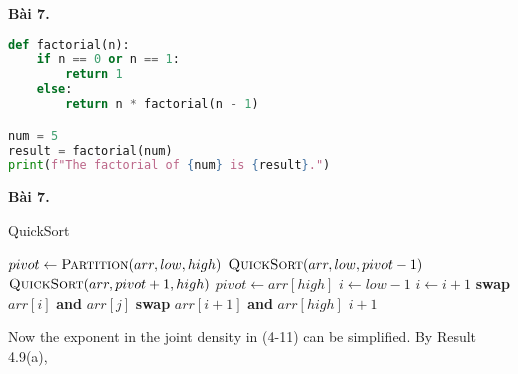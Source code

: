 \documentclass[a4paper,12pt]{article}
\begin{document}

\lstset{style=my_style}

\textbf{Bài 7.}
\begin{lstlisting}[language=Python, caption={Mã nguồn Python}, label={lst:python-code}]
def factorial(n):
    if n == 0 or n == 1:
        return 1
    else:
        return n * factorial(n - 1)

num = 5
result = factorial(num)
print(f"The factorial of {num} is {result}.")
\end{lstlisting}

\textbf{Bài 7.} \\
\begin{algorithm}[H]
    \caption{QuickSort}
    \begin{algorithmic}[1]
                \State $pivot \gets \Call{Partition}{arr, low, high}$
                \State $\Call{QuickSort}{arr, low, pivot - 1}$
                \State $\Call{QuickSort}{arr, pivot + 1, high}$
            \EndIf
        \EndProcedure
        \newline
            \State $pivot \gets arr[high]$
            \State $i \gets low - 1$
                    \State $i \gets i + 1$
                    \State \textbf{swap} $arr[i]$ \textbf{and} $arr[j]$
                \EndIf
            \EndFor
            \State \textbf{swap} $arr[i + 1]$ \textbf{and} $arr[high]$
            \State \Return $i + 1$
        \EndProcedure
    \end{algorithmic}
\end{algorithm}

\newpage
Now the exponent in the joint density in (4-11) can be simplified. By Result 4.9(a),
\end{document}

